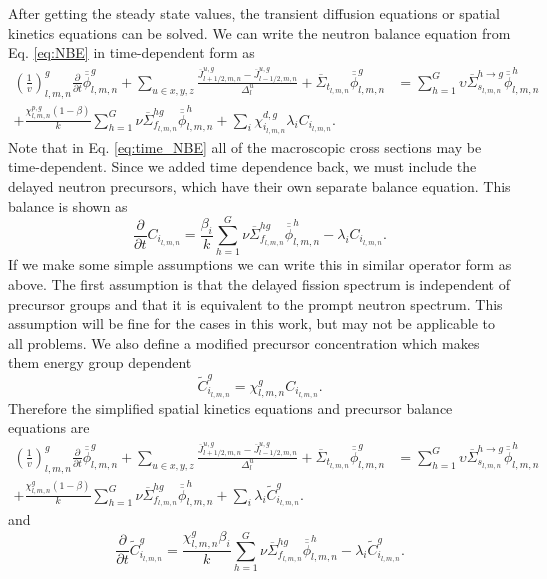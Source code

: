 \documentclass{ansconf}
\numberwithin{equation}{section}
\begin{document}
After getting the steady state values, the transient diffusion equations or spatial kinetics equations can be solved. We can write the neutron balance equation from Eq. \eqref{eq:NBE} in time-dependent form as
\begin{align}
\label{eq:time_NBE}
\left(\frac{1}{v}\right)_{l,m,n}^g\frac{\partial}{\partial t}\overline{\overline{\phi}}_{l,m,n}^g + \sum_{u \in x,y,z} \frac{\overline{J}^{u,g}_{l+1/2,m,n} - \overline{J}^{u,g}_{l-1/2,m,n}}{\Delta_l^u} + \overline\Sigma_{t_{l,m,n}}\overline{\overline{\phi}}_{l,m,n}^g  & = \sum_{h=1}^G\upsilon\overline\Sigma^{h\rightarrow g}_{s_{l,m,n}}\overline{\overline{\phi}}_{l,m,n}^h \\ + \frac{\chi_{l,m,n}^{p,g}\left(1-\beta\right)}{k}\sum_{h=1}^G\nu\overline\Sigma^{hg}_{f_{l,m,n}}  \overline{\overline{\phi}}_{l,m,n}^h + \sum_i\chi_{i_{l,m,n}}^{d,g}\lambda_i C_{i_{l,m,n}}\nonumber.
\end{align}
Note that in Eq. \eqref{eq:time_NBE} all of the macroscopic cross sections may be time-dependent. Since we added time dependence back, we must include the delayed neutron precursors, which have their own separate balance equation. This balance is shown as
\begin{equation}
    \frac{\partial}{\partial t}C_{i_{l,m,n}} = \frac{\beta_i}{k}\sum_{h=1}^G\nu\overline\Sigma^{hg}_{f_{l,m,n}} \overline{\overline{\phi}}_{l,m,n}^h - \lambda_iC_{i_{l,m,n}}.
\end{equation}
If we make some simple assumptions we can write this in similar operator form as above. The first assumption is that the delayed fission spectrum is independent of precursor groups and that it is equivalent to the prompt neutron spectrum. This assumption will be fine for the cases in this work, but may not be applicable to all problems. We also define a modified precursor concentration which makes them energy group dependent
\begin{equation}
    \widetilde{C}_{i_{l,m,n}}^g = \chi_{l,m,n}^g C_{i_{l,m,n}}. 
\end{equation}
Therefore the simplified spatial kinetics equations and precursor balance equations are
\begin{align}
    \left(\frac{1}{v}\right)_{l,m,n}^g\frac{\partial}{\partial t}\overline{\overline{\phi}}_{l,m,n}^g + \sum_{u \in x,y,z} \frac{\overline{J}^{u,g}_{l+1/2,m,n} - \overline{J}^{u,g}_{l-1/2,m,n}}{\Delta_l^u} + \overline\Sigma_{t_{l,m,n}}\overline{\overline{\phi}}_{l,m,n}^g  & = \sum_{h=1}^G\upsilon\overline\Sigma^{h\rightarrow g}_{s_{l,m,n}}\overline{\overline{\phi}}_{l,m,n}^h \\ + \frac{\chi_{l,m,n}^{g}\left(1-\beta\right)}{k}\sum_{h=1}^G\nu\overline\Sigma^{hg}_{f_{l,m,n}}  \overline{\overline{\phi}}_{l,m,n}^h + \sum_i\lambda_i \widetilde{C}_{i_{l,m,n}}^g\nonumber.
\end{align}
and
\begin{equation}
    \frac{\partial}{\partial t}\widetilde{C}_{i_{l,m,n}}^g = \frac{\chi_{l,m,n}^{g}\beta_i}{k}\sum_{h=1}^G\nu\overline\Sigma^{hg}_{f_{l,m,n}} \overline{\overline{\phi}}_{l,m,n}^h - \lambda_i\widetilde{C}_{i_{l,m,n}}^g.
\end{equation}
\end{document}
